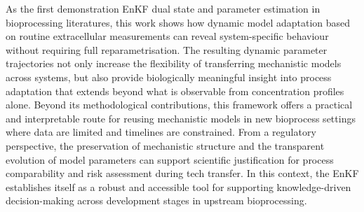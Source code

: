 As the first demonstration EnKF dual state and parameter estimation in bioprocessing literatures, this work shows how dynamic model adaptation based on routine extracellular measurements can reveal system-specific behaviour without requiring full reparametrisation. The resulting dynamic parameter trajectories not only increase the flexibility of transferring mechanistic models across systems, but also provide biologically meaningful insight into process adaptation that extends beyond what is observable from concentration profiles alone. Beyond its methodological contributions, this framework offers a practical and interpretable route for reusing mechanistic models in new bioprocess settings where data are limited and timelines are constrained. From a regulatory perspective, the preservation of mechanistic structure and the transparent evolution of model parameters can support scientific justification for process comparability and risk assessment during tech transfer. In this context, the EnKF establishes itself as a robust and accessible tool for supporting knowledge-driven decision-making across development stages in upstream bioprocessing.